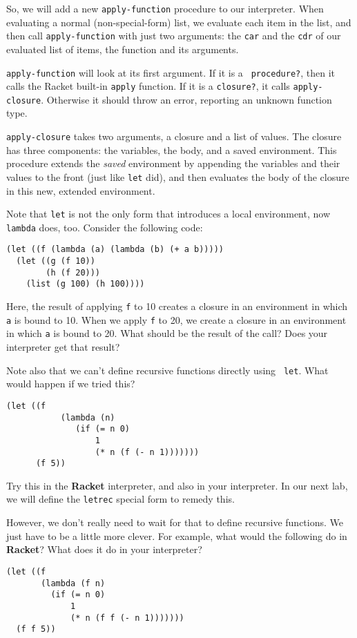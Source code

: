 \documentclass[letterpaper,12pt]{article}
\begin{document}
  So, we will add a new \texttt{apply-function} procedure to our interpreter.
  When evaluating a normal (non-special-form) list, we evaluate each item in the
  list, and then call \texttt{apply-function} with just two arguments: the
  \texttt{car} and the \texttt{cdr} of our evaluated list of items, the function
  and its arguments.

  \texttt{apply-function} will look at its first argument.  If it is a \texttt{
    procedure?}, then it calls the Racket built-in \texttt{apply} function.  If
  it is a \texttt{closure?}, it calls \texttt{apply-closure}.  Otherwise it
  should throw an error, reporting an unknown function type.

  \texttt{apply-closure} takes two arguments, a closure and a list of values.
  The closure has three components: the variables, the body, and a saved
  environment.  This procedure extends the {\em saved} environment by appending
  the variables and their values to the front (just like \texttt{let} did), and
  then evaluates the body of the closure in this new, extended environment.

  Note that \texttt{let} is not the only form that introduces a local
  environment, now \texttt{lambda} does, too.  Consider the following code:
\begin{Verbatim}[frame=single]
(let ((f (lambda (a) (lambda (b) (+ a b)))))
  (let ((g (f 10))
        (h (f 20)))
    (list (g 100) (h 100))))  
\end{Verbatim}
  Here, the result of applying \texttt{f} to 10 creates a closure in an
  environment in which \texttt{a} is bound to 10.  When we apply \texttt{f} to
  20, we create a closure in an environment in which \texttt{a} is bound to 20.
  What should be the result of the call?  Does your interpreter get that result?

  Note also that we can't define recursive functions directly using \texttt{
    let}.  What would happen if we tried this?
\begin{Verbatim}[frame=single]
  (let ((f
           (lambda (n)
              (if (= n 0)
                  1
                  (* n (f (- n 1)))))))
      (f 5))
\end{Verbatim}
  Try this in the \textbf{Racket} interpreter, and also in your interpreter.  In
  our next lab, we will define the \texttt{letrec} special form to remedy this.

  However, we don't really need to wait for that to define recursive functions.
  We just have to be a little more clever.  For example, what would the
  following do in \textbf{Racket}?  What does it do in your interpreter?
\begin{Verbatim}[frame=single]
(let ((f
       (lambda (f n)
         (if (= n 0)
             1
             (* n (f f (- n 1)))))))
  (f f 5))
\end{Verbatim}
\end{document}
